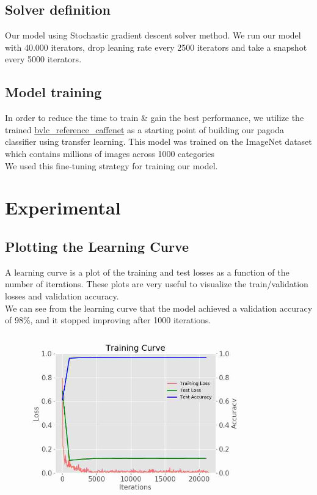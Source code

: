 \documentclass[12pt,a4paper]{article}
\begin{document}
\subsection{Solver definition}
Our model using Stochastic gradient descent solver method.
We run our model with 40.000 iterators, drop leaning rate every 2500 iterators and take a snapshot every 5000 iterators.
\subsection{Model training}
In order to reduce the time to train \& gain the best performance, we utilize the trained \href{https://github.com/BVLC/caffe/tree/master/models/bvlc\_reference\_caffenet}{bvlc\_reference\_caffenet} as a starting point of building our pagoda classifier using transfer learning. This model was trained on the ImageNet dataset which contains millions of images across 1000 categories\\
We used this fine-tuning strategy for training our model.
\section{Experimental}

\subsection{Plotting the Learning Curve}
A learning curve is a plot of the training and test losses as a function of the number of iterations. These plots are very useful to visualize the train/validation losses and validation accuracy. \\
We can see from the learning curve that the model achieved a validation accuracy of 98\%, and it stopped improving after 1000 iterations.
\begin{figure}[H]
\centering
\includegraphics[width=0.8\textwidth]{images/trainningcurve.jpg}
\end{figure}
\end{document}
